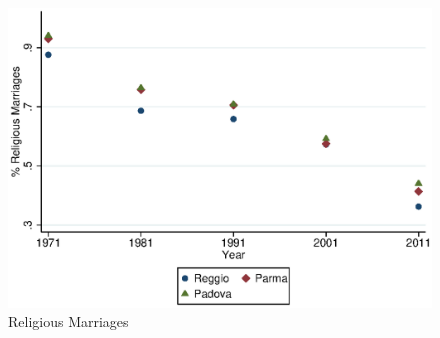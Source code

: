     \begin{figure}[H]
    \centering
    \caption{Religious Marriages}
    \includegraphics[width=\textwidth]{output/rel_mar.eps}
	\end{figure}
	
